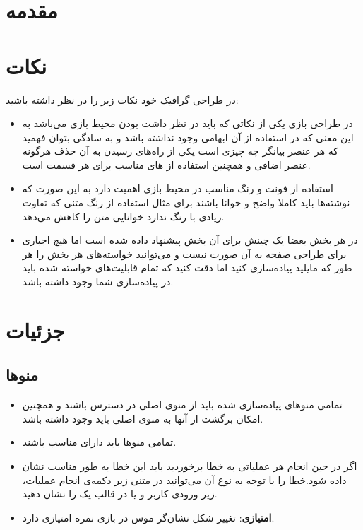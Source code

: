 \documentclass[]{article}
\begin{document}
\newpage

\section*{{\titr مقدمه}}

\section*{{\titr نکات}}
در طراحی گرافیک خود نکات زیر را در نظر داشته باشید:

\begin{itemize}
    \item در طراحی بازی یکی از نکاتی که باید در نظر داشت  بودن محیط بازی می‌باشد به این معنی که در استفاده از آن ابهامی وجود نداشته باشد و به سادگی بتوان فهمید که هر عنصر بیانگر چه چیزی است یکی از را‌ه‌های رسیدن به آن حذف هرگونه عنصر اضافی و همچنین استفاده از  های مناسب برای هر قسمت است.
    \item استفاده از فونت و رنگ مناسب در محیط بازی اهمیت دارد به این صورت که نوشته‌ها باید کاملا واضح و خوانا باشند برای مثال استفاده از رنگ متنی که تفاوت زیادی با رنگ  ندارد خوانایی متن را کاهش می‌دهد.
    \item در هر بخش بعضا یک چینش برای آن بخش پیشنهاد داده شده است اما هیچ اجباری برای طراحی صفحه به آن صورت نیست و می‌توانید خواسته‌های هر بخش را هر طور که مایلید پیاده‌سازی کنید اما دقت کنید که تمام قابلیت‌های خواسته شده باید در پیا‌ده‌سازی شما وجود داشته باشد.
\end{itemize}

\section*{{\titr جزئیات}}

\subsection*{{\titr منوها}}

\begin{itemize}
    \item تمامی منو‌های پیاده‌سازی شده باید از منوی‌ اصلی در دسترس باشند و همچنین امکان برگشت از آنها به منوی اصلی باید وجود داشته باشد.
    \item تمامی‌ منو‌ها باید دارای  مناسب باشند.
    \item اگر در حین انجام هر عملیاتی به خطا برخوردید باید این خطا به طور مناسب نشان داده شود.خطا را با توجه به نوع آن می‌توانید در متنی زیر دکمه‌ی انجام عملیات،  زیر  ورودی کاربر و یا در قالب  یک  را نشان دهید.
    \item \textbf{امتیازی}: تغییر شکل نشان‌گر موس در بازی نمره امتیازی دارد. 
\end{itemize}
\end{document}
